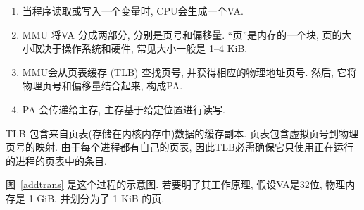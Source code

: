 \documentclass[12pt]{book}
\begin{document}
{\begin{enumerate}

%
%
%
\item 当程序读取或写入一个变量时, CPU会生成一个VA.

\item MMU 将VA 分成两部分, 分别是页号和偏移量.
``页''是内存的一个块, 页的大小取决于操作系统和硬件, 常见大小一般是 1--4 KiB.

\item MMU会从页表缓存 (TLB) 查找页号, 并获得相应的物理地址页号.
然后, 它将物理页号和偏移量结合起来, 构成PA.

\item PA 会传递给主存, 主存基于给定位置进行读写.

\end{enumerate}

%
TLB 包含来自页表(存储在内核内存中)数据的缓存副本.
页表包含虚拟页号到物理页号的映射. 
由于每个进程都有自己的页表, 因此TLB必需确保它只使用正在运行的进程的页表中的条目.

图~\ref{addtrans} 是这个过程的示意图.
若要明了其工作原理, 假设VA是32位, 物理内存是 1 GiB, 并划分为了 1 KiB 的页.

\begin{itemize}


\end{itemize}}
\end{document}
